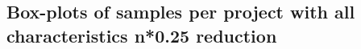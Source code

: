 \begin{appendices}
\chapter{Box-plots of samples per project with all characteristics n*0.25 reduction}
\label{ap:full_25}
\begin{figure}[h]
    \centering
    \qquad
\end{figure}


\end{appendices}
